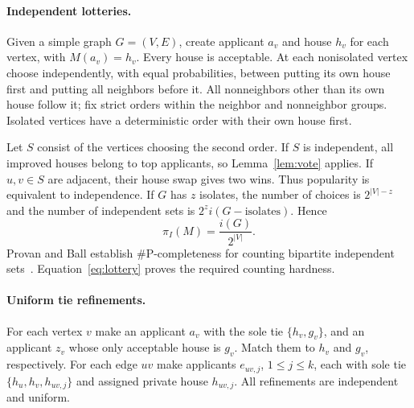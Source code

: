 \documentclass[11pt]{article}
\newcommand{\sharpP}{\#\mathrm P}
\begin{document}
\paragraph{Independent lotteries.}
Given a simple graph $G=(V,E)$, create applicant $a_v$ and house $h_v$ for each vertex, with $M(a_v)=h_v$. Every house is acceptable. At each nonisolated vertex choose independently, with equal probabilities, between putting its own house first and putting all neighbors before it. All nonneighbors other than its own house follow it; fix strict orders within the neighbor and nonneighbor groups. Isolated vertices have a deterministic order with their own house first.

Let $S$ consist of the vertices choosing the second order. If $S$ is independent, all improved houses belong to top applicants, so Lemma~\ref{lem:vote} applies. If $u,v\in S$ are adjacent, their house swap gives two wins. Thus popularity is equivalent to independence. If $G$ has $z$ isolates, the number of choices is $2^{|V|-z}$ and the number of independent sets is $2^z i(G-\text{isolates})$. Hence
\begin{equation}\label{eq:lottery}
 \pi_I(M)=\frac{i(G)}{2^{|V|}}.
\end{equation}
Provan and Ball establish $\sharpP$-completeness for counting bipartite independent sets~\cite[\S1, problem~2; \S2, reduction~2]{pb}. Equation~\eqref{eq:lottery} proves the required counting hardness.

\paragraph{Uniform tie refinements.}
For each vertex $v$ make an applicant $a_v$ with the sole tie $\{h_v,g_v\}$, and an applicant $z_v$ whose only acceptable house is $g_v$. Match them to $h_v$ and $g_v$, respectively. For each edge $uv$ make applicants $e_{uv,j}$, $1\leq j\leq k$, each with sole tie $\{h_u,h_v,h_{uv,j}\}$ and assigned private house $h_{uv,j}$. All refinements are independent and uniform.
\end{document}
